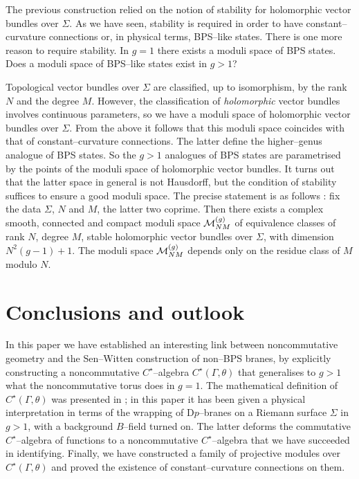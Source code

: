 \documentclass[a4paper,a4paper]{article}
\begin{document}
The previous construction relied on the notion of stability for 
holomorphic vector bundles over $\Sigma$. As we have seen, stability is 
required in order to have constant--curvature connections or, in physical 
terms, BPS--like states. There is one more reason to require stability.
In $g=1$ there exists a moduli space of BPS states. Does a moduli space 
of BPS--like states exist in $g>1$?
  
Topological vector bundles over $\Sigma$ are classified, up to isomorphism, by  
the rank $N$ and the degree $M$. However, the classification of {\it  
holomorphic} vector bundles involves continuous parameters, so we have a  
moduli space of holomorphic vector bundles over $\Sigma$. From the above it  
follows that this moduli space coincides with that of constant--curvature  
connections. The latter define the higher--genus analogue of BPS states. So the  
$g>1$ analogues of BPS states are parametrised by the points of the moduli space  
of holomorphic vector bundles. It turns out that the latter space in general  
is not Hausdorff, but the condition of stability suffices to ensure a good  
moduli space. The precise statement is as follows \cite{THADDEUS}:  
fix the data $\Sigma$, $N$ and $M$, the latter two coprime. Then there  
exists a complex smooth, connected and compact moduli space  
${\cal M}^{(g)}_{NM}$ of  
equivalence classes of rank $N$, degree $M$, stable holomorphic vector bundles  
over $\Sigma$, with dimension $N^2(g-1)+1$. The moduli space  
${\cal M}^{(g)}_{NM}$ depends only on the residue class of $M$ modulo $N$. 

\section{Conclusions and outlook}\label{outlook} 
 
In this paper we have established an interesting link between 
noncommutative geometry and the Sen--Witten construction of non--BPS branes,
by explicitly constructing a noncommutative $C^{\star}$--algebra 
$C^{\star}(\Gamma, \theta)$ that generalises to $g>1$ what the 
noncommutative torus does in $g=1$. The mathematical definition of 
$C^{\star}(\Gamma, \theta)$ was presented 
in \cite{PROCEEDINGS}; in this paper it has been given a physical interpretation 
in terms of the wrapping of D$p$--branes on a Riemann surface $\Sigma$ in $g>1$, 
with a background $B$--field turned on. The latter deforms the commutative 
$C^{\star}$--algebra of functions to a noncommutative $C^{\star}$--algebra 
that we have succeeded in identifying. Finally, we have constructed 
a family of projective modules over $C^{\star}(\Gamma, \theta)$ 
and proved the existence of constant--curvature connections on them.
\end{document}
